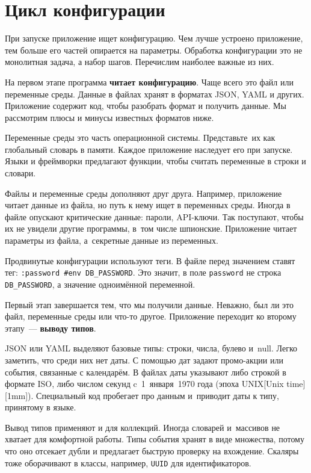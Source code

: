 \section{Цикл конфигурации}

При запуске приложение ищет конфигурацию. Чем лучше устроено приложение, тем
больше его частей опирается на параметры. Обработка конфигурации это не
монолитная задача, а набор шагов. Перечислим наиболее важные из них.

На первом этапе программа \textbf{читает конфигурацию}. Чаще всего это файл или
переменные среды. Данные в файлах хранят в форматах JSON, YAML и
других. Приложение содержит код, чтобы разобрать формат и получить данные. Мы
рассмотрим плюсы и минусы известных форматов ниже.

Переменные среды это часть операционной системы. Представьте~их как глобальный
словарь в памяти. Каждое приложение наследует его при запуске. Языки и
фреймворки предлагают функции, чтобы считать переменные в строки и словари.

Файлы и переменные среды дополняют друг друга. Например, приложение читает
данные из файла, но путь к нему ищет в переменных среды. Иногда в файле опускают
критические данные: пароли, API-ключи. Так поступают, чтобы их не увидели другие
программы, в~том числе шпионские. Приложение читает параметры из файла,
а~секретные данные из переменных.


Продвинутые конфигурации используют теги. В файле перед значением
ставят тег: \verb|:password #env DB_PASSWORD|. Это значит, в поле
\verb|password| не строка \verb|DB_PASSWORD|, а значение одноимённой
переменной.

Первый этап завершается тем, что мы получили данные. Неважно, был ли это файл,
переменные среды или что-то другое. Приложение переходит ко второму этапу~---
\textbf{выводу типов}.


JSON или YAML выделяют базовые типы: строки, числа, булево и~null. Легко
заметить, что среди них нет даты. С помощью дат задают промо-акции или события,
связанные с календарём. В файлах даты указывают либо строкой в формате ISO, либо
числом секунд c~1~января~1970 года (эпоха UNIX[Unix time][1mm]).
Специальный код пробегает про данным и~приводит даты к типу, принятому в языке.

Вывод типов применяют и для коллекций. Иногда словарей и~массивов не хватает для
комфортной работы. Типы события хранят в виде множества, потому что оно отсекает
дубли и предлагает быструю проверку на вхождение. Скаляры тоже оборачивают в
классы, например, \verb|UUID| для идентификаторов.

